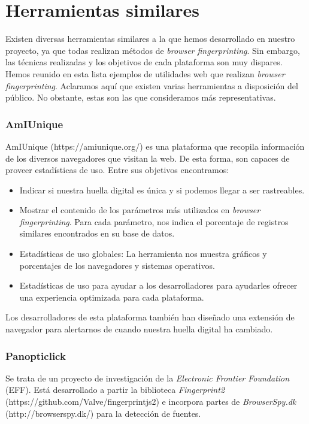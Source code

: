 \section{Herramientas similares}

Existen diversas herramientas similares a la que hemos desarrollado en nuestro proyecto, ya que todas realizan métodos de \textit{browser fingerprinting}. Sin embargo, las técnicas realizadas y los objetivos de cada plataforma son muy dispares. Hemos reunido en esta lista ejemplos de utilidades web que realizan \textit{browser fingerprinting}. Aclaramos aquí que existen varias herramientas a disposición del público. No obstante, estas son las que consideramos más representativas. \par

\subsubsection{AmIUnique}

AmIUnique (https://amiunique.org/) es una plataforma que recopila información de los diversos navegadores que visitan la web. De esta forma, son capaces de proveer estadísticas de uso. 
Entre sus objetivos encontramos:
\begin{itemize}
	\item Indicar si nuestra huella digital es única y si podemos llegar a ser rastreables.
	\item Mostrar el contenido de los parámetros más utilizados en \textit{browser fingerprinting}. Para cada parámetro, nos indica el porcentaje de registros similares encontrados en su base de datos.
	\item Estadísticas de uso globales: La herramienta nos muestra gráficos y porcentajes de los navegadores y sistemas operativos.
	\item Estadísticas de uso para ayudar a los desarrolladores para ayudarles ofrecer una experiencia optimizada para cada plataforma.
\end{itemize}

Los desarrolladores de esta plataforma también han diseñado una extensión de navegador para alertarnos de cuando nuestra huella digital ha cambiado. \par 

\subsubsection{Panopticlick}

Se trata de un proyecto de investigación de la \textit{Electronic Frontier Foundation} (EFF). Está desarrollado a partir la biblioteca \textit{Fingerprint2} (https://github.com/Valve/fingerprintjs2) e incorpora partes de \textit{BrowserSpy.dk} (http://browserspy.dk/) para la detección de fuentes. \par 

